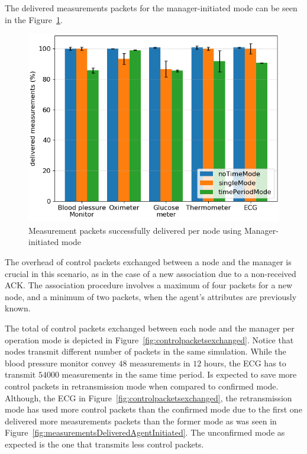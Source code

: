 The delivered measurements packets for the manager-initiated mode can be seen in the Figure~\ref{fig:measurementsDeliveredManagerInitiated}.

\begin{figure}[htbp]
\centerline{\includegraphics[width=\linewidth]{figures/MeasurementsDelivered-ManagerinitiatedMode.png}}
\caption{Measurement packets successfully delivered per node using Manager-initiated mode}
\label{fig:measurementsDeliveredManagerInitiated}
\end{figure}

The overhead of control packets exchanged between a node and the manager is crucial in this scenario, as in the case of a new association due to a non-received ACK. The association procedure involves a maximum of four packets for a new node, and a minimum of two packets, when the agent's attributes are previously known.

The total of control packets exchanged between each node and the manager per operation mode is depicted in Figure~\ref{fig:controlpacketsexchanged}.
Notice that nodes transmit different number of packets in the same simulation. While the blood pressure monitor convey $48$ measurements in $12$ hours, the ECG has to transmit $54000$ measurements in the same time period. Is expected to save more control packets in retransmission mode when compared to confirmed mode. Although, the ECG in Figure~\ref{fig:controlpacketsexchanged}, the retransmission mode has used more control packets than the confirmed mode due to the first one delivered more measurements packets than the former mode as was seen in Figure~\ref{fig:measurementsDeliveredAgentInitiated}.
The unconfirmed mode as expected is the one that transmits less control packets.


